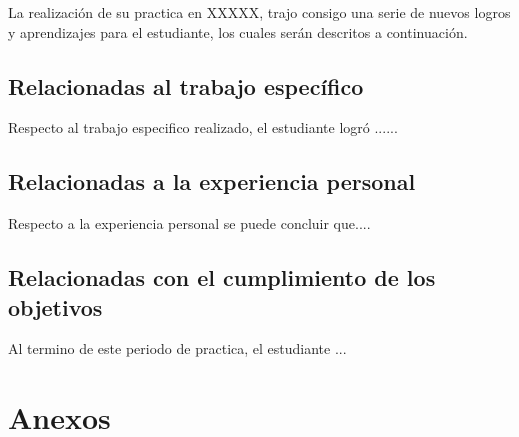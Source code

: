 \documentclass[12pt,letter,spanish]{article}
\begin{document}
La realización de su practica en XXXXX, trajo consigo una serie de nuevos logros y aprendizajes para el estudiante, los cuales serán descritos a continuación.

\subsection{Relacionadas al trabajo específico}
Respecto al trabajo especifico realizado, el estudiante logró ......

\subsection{Relacionadas a la experiencia personal}
Respecto a la experiencia personal se puede concluir que....

\subsection{Relacionadas con el cumplimiento de los objetivos}

Al termino de este periodo de practica, el estudiante ...




\newpage
{}
\printbibliography
 

\newpage
\hspace{0pt}
\vfill

\section*{\centering Anexos}
\vfill
\hspace{0pt}

\end{document}
